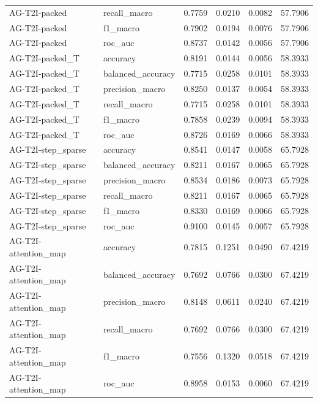 \begin{tabular}{llrrrr}
AG-T2I-packed & recall_macro & 0.7759 & 0.0210 & 0.0082 & 57.7906 \\
AG-T2I-packed & f1_macro & 0.7902 & 0.0194 & 0.0076 & 57.7906 \\
AG-T2I-packed & roc_auc & 0.8737 & 0.0142 & 0.0056 & 57.7906 \\
AG-T2I-packed_T & accuracy & 0.8191 & 0.0144 & 0.0056 & 58.3933 \\
AG-T2I-packed_T & balanced_accuracy & 0.7715 & 0.0258 & 0.0101 & 58.3933 \\
AG-T2I-packed_T & precision_macro & 0.8250 & 0.0137 & 0.0054 & 58.3933 \\
AG-T2I-packed_T & recall_macro & 0.7715 & 0.0258 & 0.0101 & 58.3933 \\
AG-T2I-packed_T & f1_macro & 0.7858 & 0.0239 & 0.0094 & 58.3933 \\
AG-T2I-packed_T & roc_auc & 0.8726 & 0.0169 & 0.0066 & 58.3933 \\
AG-T2I-step_sparse & accuracy & 0.8541 & 0.0147 & 0.0058 & 65.7928 \\
AG-T2I-step_sparse & balanced_accuracy & 0.8211 & 0.0167 & 0.0065 & 65.7928 \\
AG-T2I-step_sparse & precision_macro & 0.8534 & 0.0186 & 0.0073 & 65.7928 \\
AG-T2I-step_sparse & recall_macro & 0.8211 & 0.0167 & 0.0065 & 65.7928 \\
AG-T2I-step_sparse & f1_macro & 0.8330 & 0.0169 & 0.0066 & 65.7928 \\
AG-T2I-step_sparse & roc_auc & 0.9100 & 0.0145 & 0.0057 & 65.7928 \\
AG-T2I-attention_map & accuracy & 0.7815 & 0.1251 & 0.0490 & 67.4219 \\
AG-T2I-attention_map & balanced_accuracy & 0.7692 & 0.0766 & 0.0300 & 67.4219 \\
AG-T2I-attention_map & precision_macro & 0.8148 & 0.0611 & 0.0240 & 67.4219 \\
AG-T2I-attention_map & recall_macro & 0.7692 & 0.0766 & 0.0300 & 67.4219 \\
AG-T2I-attention_map & f1_macro & 0.7556 & 0.1320 & 0.0518 & 67.4219 \\
AG-T2I-attention_map & roc_auc & 0.8958 & 0.0153 & 0.0060 & 67.4219 \\
\bottomrule
\end{tabular}
